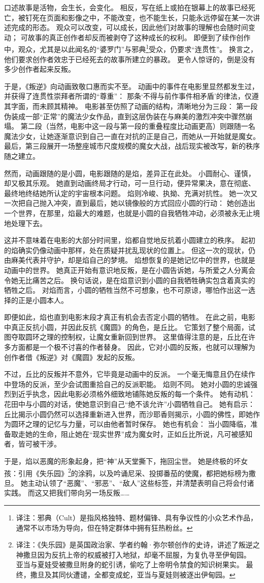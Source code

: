 口述故事是活物，会生长，会变化。
相反，写在纸上或拍在银幕上的故事已经死亡，被钉死在页面和影像之中，不能改变，也不能生长，只能永远停留在某一次讲述完成的形态。
观众可以改变，可以成长，因此他们对故事的理解也会随时间变动；
可故事的真正创作者却反而被剥夺了这种成长的权利。
即便到了续作创作中，观众，尤其是以此闻名的“婆罗门”与邪典\footnote{
    译注：邪典（Cult）是指风格独特、题材偏锋、具有争议性的小众艺术作品，通常不以市场为导向，但在特定群体中拥有狂热粉丝。
}受众，仍要求“连贯性”。
换言之，他们要求创作者效忠于已经死去的故事所建立的暴政。
更令人惊讶的，倒是没有多少创作者起来反叛。

于是，《叛逆》向动画致敬口惠而实不至。
动画中的事件在电影里显然都发生过，并获得了连贯性崇拜者所谓的“尊重”：
那条‘不得与前作事件相矛盾’的律法，仅遵其字面，而未顾其精神。
电影甚至仿照了动画的结构，清晰地分为三段：
第一段伪装成一部“正常”的魔法少女作品，直到这层伪装在与麻美的激烈冲突中骤然崩塌。
第二段（当然，电影中这一段与第一段的重叠程度比动画更高）则跟随一名魔法少女，让她逐渐意识到自己一直在对抗的正是自己，而她从一开始就是魔女。
最后，第三段展开一场整座城市尺度规模的魔女大战，战后现实被改写，新的秩序随之建立。

然而，动画跟随的是小圆，电影跟随的是焰，差异正在此处。
小圆耐心、谨慎，却又极其乐观。
她直到动画终局才行动，可一旦行动，便异常果决，意在彻底、最终地终结她所认定的宇宙根本问题。
焰则冷峻、执拗、充满对抗性。
她一次又一次把自己抛入冲突，直到最后，她以镜像般的方式回应小圆的行动：
她创造出一个世界，在那里，焰最大的难题，也就是小圆的自我牺牲冲动，必须被永无止境地处理下去。

这并不意味着在电影的大部分时间里，焰都自觉地反抗着小圆建立的秩序。
起初的焰确实仍像动画中那样，处在质疑并扰乱现状的位置上。
但这一次的现状，仍由麻美代表并守护，却是焰自己的梦境。
焰想恢复的是她记忆中的世界，也就是动画中的世界。
她真正开始有意识地反叛，是在小圆告诉她，与所爱之人分离会令她无比痛苦之后。
换句话说，是在焰意识到小圆的自我牺牲确实包含着真实的牺牲之后。
对焰而言，小圆的牺牲当然不可想象，也不可原谅，哪怕作出这一选择的正是小圆本人。

即便如此，焰也直到电影末段才真正有机会去否定小圆的牺牲。
在此之前，电影中真正反抗小圆，并因此反抗《魔圆》的角色，是丘比。
它策划了整个局面，试图夺取圆环之理的控制权，让魔女重新回到世界。
这里值得注意的是，丘比在许多方面都是一个极不讨喜的作者替身。
因此，它对小圆的反叛，也就可以理解为创作者借《叛逆》对《魔圆》发起的反叛。

不过，丘比的反叛并不意外，它毕竟是动画中的反派。
一个毫无悔意且仍在续作中登场的反派，至少会试图重拾自己的反派职能。
焰则不同。
她对小圆的忠诚强烈到近乎执念，因此电影必须格外细致地铺陈她反叛的每一个条件。
她有动机：
花田中与小圆的对话，使她意识到自己“绝不该允许”小圆牺牲自己。
她有启示：
丘比揭示小圆仍然可以选择重新进入世界，而沙耶香则揭示，小圆的佛性，即她作为圆环之理的记忆与力量，可以由他者暂时保存。
她也有机会：
当小圆降临，准备取走她的生命，阻止她在“现实世界”成为魔女时，正如丘比所说，凡可被感知者，皆可被干涉。

于是，焰以恶魔的形象起身，把“神”从天堂撕下，拖回尘世。
她是终极的坏女孩：引用《失乐园》\footnote{%
    译注：《失乐园》是英国政治家、学者约翰·弥尔顿创作的史诗，讲述了叛逆之神撒旦因为反抗上帝的权威被打入地狱，却毫不屈服，为复仇寻至伊甸园。
    亚当与夏娃受被撒旦附身的蛇引诱，偷吃了上帝明令禁食的知识树果实。
    最终，撒旦及其同伙遭谴，全都变成蛇，亚当与夏娃则被逐出伊甸园。
}的涂鸦，以及吟诵尼采、投掷番茄的使魔，都把她标榜为撒旦。
她主动认领了“恶魔”、“邪恶”、“敌人”这些标签，并清楚表明自己将会付诸实践。
而这又把我们带向另一场反叛……
